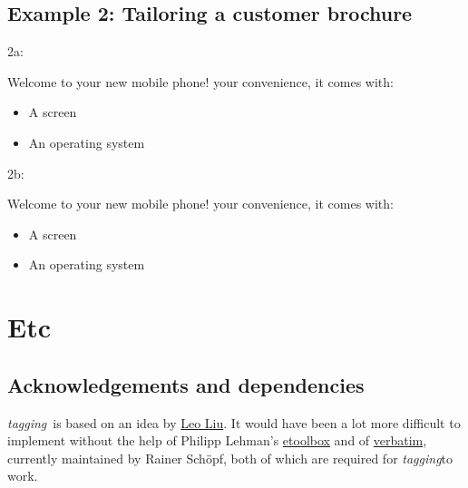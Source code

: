 \documentclass[a4paper,12pt,twoside,openany]{memoir}
\newcommand{\tpname}{\textsf{\itshape tagging}}
\begin{document}
\section{Example 2: Tailoring a customer brochure}
\noindent 2a:
\begin{LTXexample}[pos=b]
Welcome to your new mobile phone!
 your convenience,
it comes with:
\begin{itemize}
    \item A screen
    \item An operating system
\end{itemize}
\end{LTXexample}
\vspace*{\baselineskip}
\noindent 2b:
\begin{LTXexample}[pos=b]
Welcome to your new mobile phone!
 your convenience,
it comes with:
\begin{itemize}
    \item A screen
    \item An operating system
\end{itemize}
\end{LTXexample}
\chapter{Etc}
\section{Acknowledgements and dependencies}

\tpname\ is based on an idea by \href{http://tex.stackexchange.com/users/2674/leo-liu}{Leo Liu}.
It would have been a lot more difficult to implement without the help of 
Philipp Lehman's
\href{http://www.ctan.org/tex-archive/macros/latex/contrib/etoolbox}{etoolbox}
and of
\href{http://www.ctan.org/pkg/verbatim}{verbatim}, currently maintained by
Rainer Schöpf, both of which are required for \tpname to work.
\end{document}
